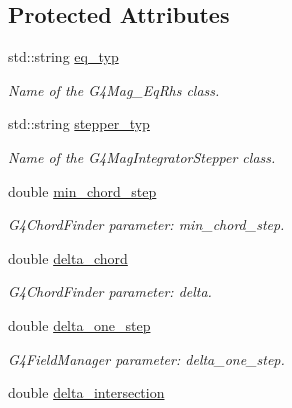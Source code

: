 \subsection*{Protected Attributes}
\begin{DoxyCompactItemize}
\item 
std::string \hyperlink{struct_d_d4hep_1_1_simulation_1_1_geant4_field_tracking_setup_aade0e19505a1c090a549c923b079ca56}{eq\_\-typ}
\begin{DoxyCompactList}\small\item\em Name of the G4Mag\_\-EqRhs class. \item\end{DoxyCompactList}\item 
std::string \hyperlink{struct_d_d4hep_1_1_simulation_1_1_geant4_field_tracking_setup_ab9e3cc336df0378ecdb3706c03347f9c}{stepper\_\-typ}
\begin{DoxyCompactList}\small\item\em Name of the G4MagIntegratorStepper class. \item\end{DoxyCompactList}\item 
double \hyperlink{struct_d_d4hep_1_1_simulation_1_1_geant4_field_tracking_setup_a1ffabcaa88a6f30609794dc2f4c01d22}{min\_\-chord\_\-step}
\begin{DoxyCompactList}\small\item\em G4ChordFinder parameter: min\_\-chord\_\-step. \item\end{DoxyCompactList}\item 
double \hyperlink{struct_d_d4hep_1_1_simulation_1_1_geant4_field_tracking_setup_ac1e938991c5848a1a0cda7df729b5366}{delta\_\-chord}
\begin{DoxyCompactList}\small\item\em G4ChordFinder parameter: delta. \item\end{DoxyCompactList}\item 
double \hyperlink{struct_d_d4hep_1_1_simulation_1_1_geant4_field_tracking_setup_a7cc063c19cc28d0226234c6cb5e9b10e}{delta\_\-one\_\-step}
\begin{DoxyCompactList}\small\item\em G4FieldManager parameter: delta\_\-one\_\-step. \item\end{DoxyCompactList}\item 
double \hyperlink{struct_d_d4hep_1_1_simulation_1_1_geant4_field_tracking_setup_ad0e9178802e02034db7130dc778d1fc7}{delta\_\-intersection}

\end{DoxyCompactItemize}
